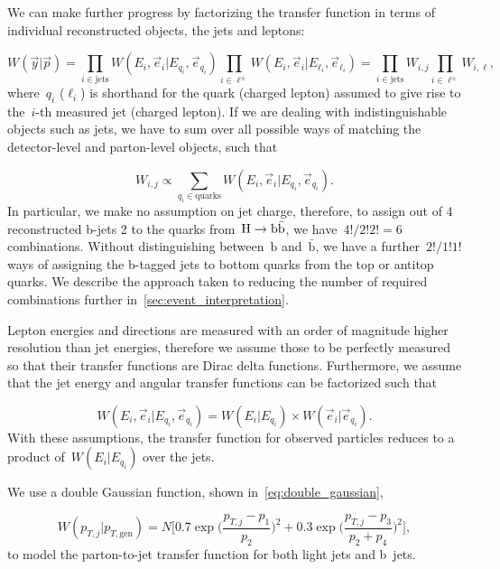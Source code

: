 We can make further progress by factorizing the transfer function in terms of individual reconstructed objects, the jets and leptons:

\begin{equation}
W(\vec{y} | \vec{p}) = \prod_{i\in \mathrm{jets}} W(E_i, \vec{e}_i | E_{q_i}, \vec{e}_{q_i})
\prod_{i\in \ell^\pm} W(E_i, \vec{e}_i | E_{\ell_i}, \vec{e}_{\ell_i}) = \prod_{i \in \mathrm{jets}} W_{i,j} \prod_{i \in \ell^\pm} W_{i,\ell},
\end{equation}
where~$q_i$ ($\ell_i$) is shorthand for the quark (charged lepton) assumed to give rise to the~$i$-th measured jet (charged lepton). If we are dealing with indistinguishable objects such as jets, we have to sum over all possible ways of matching the detector-level and parton-level objects, such that

\begin{equation}
\label{eq:tf_combination_sum}
W_{i,j} \propto \sum_{q_i \in \mathrm{quarks}} W(E_i, \vec{e}_i | E_{q_i}, \vec{e}_{q_i}).
\end{equation}
In particular, we make no assumption on jet charge, therefore, to assign out of 4 reconstructed b-jets 2 to the quarks from~$\mathrm{H} \rightarrow \mathrm{b}\bar{\mathrm{b}}$, we have~$4!/2!2! = 6$ combinations. Without distinguishing between~$\mathrm{b}$ and~$\bar{\mathrm{b}}$, we have a further~$2!/1!1!$ ways of assigning the b-tagged jets to bottom quarks from the top or antitop quarks. We describe the approach taken to reducing the number of required combinations further in~\cref{sec:event_interpretation}.

Lepton energies and directions are measured with an order of magnitude higher resolution than jet energies, therefore we assume those to be perfectly measured so that their transfer functions are Dirac delta functions.
Furthermore, we assume that the jet energy and angular transfer functions can be factorized such that

\begin{equation}
W(E_i, \vec{e}_i | E_{q_i}, \vec{e}_{q_i}) = W(E_i | E_{q_i}) \times W(\vec{e}_i | \vec{e}_{q_i}).
\end{equation}
With these assumptions, the transfer function for observed particles reduces to a product of~$W(E_i | E_{q_i})$ over the jets.

We use a double Gaussian function, shown in~\cref{eq:double_gaussian},

\begin{equation}
\label{eq:double_gaussian}
W(p_{T,j} | p_{T,\mathrm{gen}}) = N \biggl[0.7\exp{\biggl(\frac{p_{T,j} - p_1}{p_2}\biggr)^2} + 0.3\exp{\biggl(\frac{p_{T,j} - p_3}{p_2+p_4}\biggr)^2}\biggr],
\end{equation}
to model the parton-to-jet transfer function for both light jets and b~jets.

